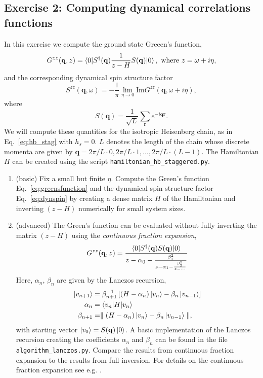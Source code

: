 \documentclass[]{article}
\theoremstyle{definition}
\begin{document}
\subsection*{Exercise 2: Computing dynamical correlations functions}
In this exercise we compute the ground state Greeen's function,
\begin{equation}
  \label{eq:greensfunction}
  G^{zz}(\mathbf{q}, z) = \braket{0|S^{\dagger}(\mathbf{q}) 
    \frac{1}{z-H}S(\mathbf{q})|0}, \text{ where } z = \omega+i\eta,
\end{equation}
and the corresponding dynamical spin structure factor
\begin{equation}
  \label{eq:dynspin}
  S^{zz}(\mathbf{q}, \omega) = -\frac{1}{\pi}\lim_{\eta \rightarrow 0}\text{Im}
  G^{zz}(\mathbf{q}, \omega + i\eta),
\end{equation}
where
$$S(\mathbf{q}) = \frac{1}{\sqrt{L}}\sum\limits_{\mathbf{r}} e^{-i\mathbf{q}{\mathbf{r}}}.$$
We will compute these quantities for the isotropic Heisenberg chain,
as in Eq.~\ref{eq:hb_stag} with $h_s=0$.  $L$ denotes the length of
the chain whose discrete momenta are given by
$\mathbf{q} = 2\pi/L \cdot 0, 2\pi/L \cdot 1, \ldots, 2\pi/L \cdot
(L-1)$.  The Hamiltonian $H$ can be created using the script
\texttt{hamiltonian\_hb\_staggered.py}.
\begin{enumerate}
\item (basic) Fix a small but finite $\eta$. Compute the Green's
  function Eq.~\ref{eq:greensfunction} and the dynamical spin
  structure factor Eq.~\ref{eq:dynspin} by creating a dense matrix $H$
  of the Hamiltonian and inverting $(z - H)$ numerically for small
  system sizes.
\item (advanced) The Green's function can be evaluated without fully
  inverting the matrix $(z-H)$ using the \textit{continuous fraction
    expansion},
  \begin{equation}
    \label{eq:contfrac}
    G^{zz}(\mathbf{q}, z) =
    \frac{\braket{0|S^{\dagger}(\mathbf{q})S(\mathbf{q})|0}}
    {z - \alpha_0- \frac{\beta_1^2}{z - \alpha_1 - \frac{\beta_2^2}{z-\cdots}}}
  \end{equation}
  Here, $\alpha_n$, $\beta_n$ are given by the Lanczos recursion,
  \begin{align*}
    \ket{v_{n+1}} &= \beta_{n+1}^{-1}\left[(H-\alpha_n)\ket{v_n} - \beta_n \ket{v_{n-1}}\right] \\
    \alpha_n &= \braket{v_n|H|v_n} \\
    \beta_{n+1} &= \parallel(H-\alpha_n)\ket{v_n} - \beta_n \ket{v_{n-1}}\parallel,
  \end{align*}
  with starting vector $\ket{v_0} = S(\mathbf{q})\ket{0}$. A basic
  implementation of the Lanczos recursion creating the coefficients
  $\alpha_n$ and $\beta_n$ can be found in the file
  \texttt{algorithm\_lanczos.py}. Compare the results from continuous
  fraction expansion to the results from full inversion. For details on
  the continuous fraction expansion see e.g. \cite{koch20118}.
\end{enumerate}
\end{document}
